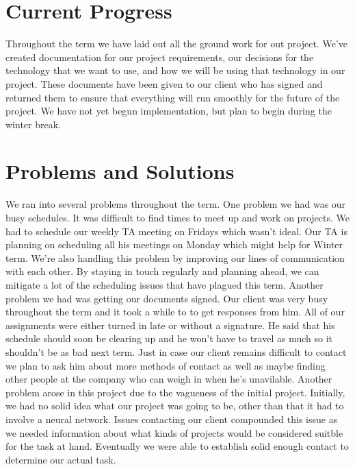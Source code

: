 \documentclass[onecolumn, draftclsnofoot,10pt, compsoc]{IEEEtran}
\begin{document}
\section{Current Progress}
Throughout the term we have laid out all the ground work for out project.
We've created documentation for our project requirements, our decisions for the technology that we want to use, and how we will be using that technology in our project.
These documents have been given to our client who has signed and returned them to ensure that everything will run smoothly for the future of the project.
We have not yet begun implementation, but plan to begin during the winter break.

\section{Problems and Solutions}
We ran into several problems throughout the term.
One problem we had was our busy schedules.
It was difficult to find times to meet up and work on projects.
We had to schedule our weekly TA meeting on Fridays which wasn't ideal.
Our TA is planning on scheduling all his meetings on Monday which might help for Winter term.
We're also handling this problem by improving our lines of communication with each other.
By staying in touch regularly and planning ahead, we can mitigate a lot of the scheduling issues that have plagued this term.
\newline\newline
Another problem we had was getting our documents signed.
Our client was very busy throughout the term and it took a while to to get responses from him.
All of our assignments were either turned in late or without a signature.
He said that his schedule should soon be clearing up and he won't have to travel as much so it shouldn't be as bad next term.
Just in case our client remains difficult to contact we plan to ask him about more methods of contact as well as maybe finding other people at the company who can weigh in when he's unavilable.
\newline\newline
Another problem arose in this project due to the vagueness of the initial project.
Initially, we had no solid idea what our project was going to be, other than that it had to involve a neural network.
Issues contacting our client compounded this issue as we needed information about what kinds of projects would be considered suitble for the task at hand.
Eventually we were able to establish solid enough contact to determine our actual task.
\end{document}
